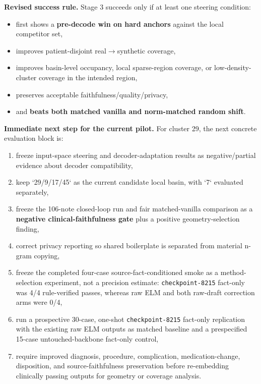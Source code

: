 \documentclass[11pt]{article}
\begin{document}
\textbf{Revised success rule.}
Stage 3 succeeds only if at least one steering condition:
\begin{itemize}[nosep]
  \item first shows a \textbf{pre-decode win on hard anchors} against the local competitor set,
  \item improves patient-disjoint real$\rightarrow$synthetic coverage,
  \item improves basin-level occupancy, local sparse-region coverage, or low-density-cluster coverage in the intended region,
  \item preserves acceptable faithfulness/quality/privacy,
  \item and \textbf{beats both matched vanilla and norm-matched random shift}.
\end{itemize}

\textbf{Immediate next step for the current pilot.}
For cluster 29, the next concrete evaluation block is:
\begin{enumerate}[nosep]
  \item freeze input-space steering and decoder-adaptation results as negative/partial evidence about decoder compatibility,
  \item keep `29/9/17/45` as the current candidate local basin, with `7` evaluated separately,
  \item freeze the 106-note closed-loop run and fair matched-vanilla comparison as a \textbf{negative clinical-faithfulness gate} plus a positive geometry-selection finding,
  \item correct privacy reporting so shared boilerplate is separated from material n-gram copying,
  \item freeze the completed four-case source-fact-conditioned smoke as a method-selection experiment, not a precision estimate: \texttt{checkpoint-8215} fact-only was 4/4 rule-verified passes, whereas raw ELM and both raw-draft correction arms were 0/4,
  \item run a prospective 30-case, one-shot \texttt{checkpoint-8215} fact-only replication with the existing raw ELM outputs as matched baseline and a prespecified 15-case untouched-backbone fact-only control,
  \item require improved diagnosis, procedure, complication, medication-change, disposition, and source-faithfulness preservation before re-embedding clinically passing outputs for geometry or coverage analysis.
\end{enumerate}
\end{document}
